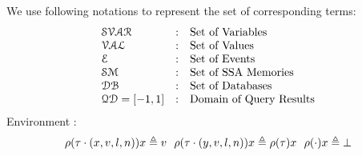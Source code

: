 We use following notations to represent the set of corresponding terms:
\[
\begin{array}{lll}
\mathcal{SVAR} & : & \mbox{Set of Variables}  
\\ 
%
\mathcal{VAL} & : & \mbox{Set of Values} 
\\ 
%
%
 \eventset  & : & \mbox{Set of Events}  
\\
%
\mathcal{SM}  & : & \mbox{{Set of SSA Memories}} 
\\
%
\dbdom  & : & \mbox{{Set of Databases}} 
\\
%
\qdom = {[-1,1]} & : & \mbox{{Domain of Query Results}}
\end{array}
\]
%
%
Environment :
\[
\rho(\mathtt{\tau} \cdot (x, v, l, n)) x \triangleq v
~~
\rho(\mathtt{\tau} \cdot (y, v, l, n)) x \triangleq \rho(\mathtt{\tau}) x
~~
\rho(\cdot) x \triangleq \bot
\]
%
%
%
